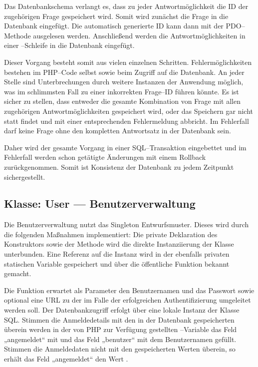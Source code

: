 Das Datenbankschema verlangt es, dass zu jeder Antwortmöglichkeit die ID der zugehörigen Frage gespeichert wird. Somit wird zunächst die Frage in die Datenbank eingefügt. Die automatisch generierte ID kann dann mit der PDO--Methode  ausgelesen werden. Anschließend werden die Antwortmöglichkeiten in einer --Schleife in die Datenbank eingefügt.

Dieser Vorgang besteht somit aus vielen einzelnen Schritten. Fehlermöglichkeiten bestehen im PHP--Code selbst sowie beim Zugriff auf die Datenbank. An jeder Stelle sind Unterbrechungen durch weitere Instanzen der Anwendung möglich, was im schlimmsten Fall zu einer inkorrekten Frage--ID führen könnte. Es ist sicher zu stellen, dass entweder die gesamte Kombination von Frage mit allen zugehörigen Antwortmöglichkeiten gespeichert wird, oder das Speichern gar nicht statt findet und mit einer entsprechenden Fehlermeldung abbricht. Im Fehlerfall darf keine Frage ohne den kompletten Antwortsatz in der Datenbank sein. 

Daher wird der gesamte Vorgang in einer SQL--Transaktion eingebettet und im Fehlerfall werden schon getätigte Änderungen mit einem Rollback zurückgenommen. Somit ist Konsistenz der Datenbank zu jedem Zeitpunkt sichergestellt.

\subsection{Klasse: User --- Benutzerverwaltung}

Die Benutzerverwaltung nutzt das Singleton Entwurfsmuster. Dieses wird durch die folgenden Maßnahmen implementiert: Die private Deklaration des Konstruktors sowie der  Methode wird die direkte Instanziierung der Klasse unterbunden. Eine Referenz auf die Instanz wird in der ebenfalls privaten statischen Variable  gespeichert und über die öffentliche Funktion  bekannt gemacht.

Die Funktion  erwartet als Parameter den Benutzernamen und das Passwort sowie optional eine URL zu der im Falle der erfolgreichen Authentifizierung umgeleitet werden soll. Der Datenbankzugriff erfolgt über eine lokale Instanz der Klasse SQL. Stimmen die Anmeldedetails mit den in der Datenbank gespeicherten überein werden in der von PHP zur Verfügung gestellten --Variable das Feld „angemeldet“ mit  und das Feld „benutzer“ mit dem Benutzernamen gefüllt. Stimmen die Anmeldedaten nicht mit den gespeicherten Werten überein, so erhält das Feld „angemeldet“ den Wert .

